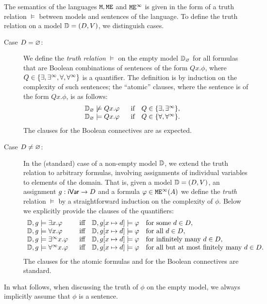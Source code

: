 \begin{definition}
The semantics of the languages $\mathtt{M}, \mathtt{M}\mathtt{E}$ and $\mathtt{M}\mathtt{E}^{\infty}$ is given in the form
of a truth relation $\models$ between models and sentences of the language.
To define the truth relation on a model $\mathbb{D} = (D ,V)$, we distinguish 
cases.


\begin{description}
\item[Case $D=\varnothing$:] 
We define the \emph{truth relation} $\models$ on the empty model ${\mathbb{D}_\varnothing}$ for
all formulas that are Boolean combinations of sentences of the form $Qx. \phi$,
where $Q \in \{ \exists, \exists^\infty, \forall, \forall^\infty \}$ is a quantifier.
The definition is by induction on the complexity of such sentences; the 
``atomic'' clauses, where the sentence is of the form $Qx. \phi$, is as follows:
\[\begin{array}{lll}
 \emodel \not\models Qx. \phi 
   & \text{if}\quad Q \in \{ \exists,  \qu \},&
\\   
\emodel \models Qx. \phi 
   & \text{if}\quad Q \in \{ \forall,  \dqu \}.&
\end{array}\]
The clauses for the Boolean connectives are as expected.

\item[Case $D \neq \varnothing$:] 
In the (standard) case of a non-empty model $\mathbb{D}$, we extend the truth 
relation to arbitrary formulas, involving assignments of individual variables 
to elements of the domain.
That is, given a model $\mathbb{D} = (D,V)$, an assignment $g :\mathsf{iVar}\to D$ and 
a formula $\varphi \in \mathtt{M}\mathtt{E}^{\infty}(A)$ we define the \emph{truth} relation $\models$ 
by a straightforward induction on the complexity of $\phi$.
Below we explicitly provide the clauses of the quantifiers:
%
\[\begin{array}{lll}
   \osmodel,g \models \exists x.\varphi 
   & \text{iff}\quad \osmodel,g [x\mapsto d] \models \varphi 
     \text{ for some $d\in D$},
\\   \osmodel,g \models \forall x.\varphi 
   & \text{iff}\quad \osmodel,g [x\mapsto d] \models \varphi 
     \text{ for all $d\in D$},
\\   \osmodel,g \models \qu x.\varphi 
   & \text{iff}\quad \osmodel,g [x\mapsto d] \models \varphi 
     \text{ for infinitely many $d\in D$},
\\   \osmodel,g \models \dqu x.\varphi 
   & \text{iff}\quad \osmodel,g [x\mapsto d] \models \varphi 
     \text{ for all but at most finitely many $d\in D$}.
\end{array}\]
The clauses for the atomic formulas and for the Boolean connectives are standard.
\end{description}
In what follows, when discussing the truth of $\phi$ on the empty model, we
always implicitly assume that $\phi$ is a sentence.
\end{definition}

